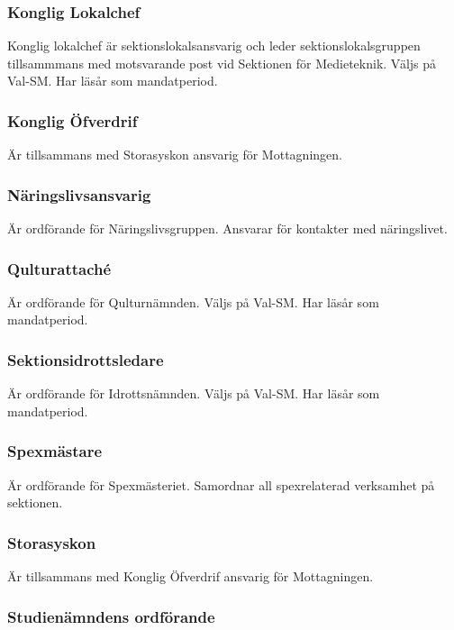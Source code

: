 \documentclass{dgovdoc}
\begin{document}
\subsubsection{Konglig Lokalchef}

Konglig lokalchef är sektionslokalsansvarig och leder sektionslokalsgruppen tillsammmans med motsvarande post vid Sektionen för Medieteknik. Väljs på Val-SM. Har läsår som mandatperiod.

\subsubsection{Konglig Öfverdrif}

Är tillsammans med Storasyskon ansvarig för Mottagningen.

\subsubsection{Näringslivsansvarig}

Är ordförande för Näringslivsgruppen. Ansvarar för kontakter med näringslivet.

\subsubsection{Qulturattaché}

Är ordförande för Qulturnämnden. Väljs på Val-SM. Har läsår som mandatperiod.

\subsubsection{Sektionsidrottsledare}

Är ordförande för Idrottsnämnden. Väljs på Val-SM. Har läsår som mandatperiod.

\subsubsection{Spexmästare}

Är ordförande för Spexmästeriet. Samordnar all spexrelaterad verksamhet på sektionen.

\subsubsection{Storasyskon}

Är tillsammans med Konglig Öfverdrif ansvarig för Mottagningen.

\subsubsection{Studienämndens ordförande}
\end{document}
